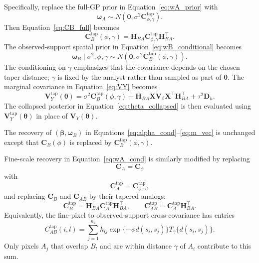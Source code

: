 \documentclass[11pt]{article}
\newcommand{\bsb}{\bm{\beta}}
\newcommand{\bsw}{\bm{\omega}}
\newcommand{\bstheta}{\bm{\theta}}
\begin{document}
Specifically, replace the full-GP prior in Equation~\eqref{eq:wA_prior} with
\begin{equation}
\bsw_A
\sim
N(\bm{0},\sigma^2\bm{C}^{\mathrm{tap}}_{\phi,\gamma}).
\label{eq:wA_taper_prior}
\end{equation}
Then Equation~\eqref{eq:CB_full} becomes
\begin{equation}
\bm{C}^{\mathrm{tap}}_B(\phi,\gamma)
=
\bm{H}_{BA}
\bm{C}^{\mathrm{tap}}_{\phi,\gamma}
\bm{H}_{BA}^{\top}.
\label{eq:CB_taper}
\end{equation}
The observed-support spatial prior in Equation~\eqref{eq:wB_conditional} becomes
\begin{equation}
\bsw_B\mid \sigma^2,\phi,\gamma
\sim
N\left(
\bm{0},
\sigma^2\bm{C}^{\mathrm{tap}}_B(\phi,\gamma)
\right).
\label{eq:wB_taper_cond}
\end{equation}
The conditioning on $\gamma$ emphasizes that the covariance depends on the chosen taper distance; $\gamma$ is fixed by the analyst rather than sampled as part of $\bstheta$.
The marginal covariance in Equation~\eqref{eq:VY} becomes
\begin{equation}
\bm{V}^{\mathrm{tap}}_Y(\bstheta)
=
\sigma^2\bm{C}^{\mathrm{tap}}_B(\phi,\gamma)
+
\bm{H}_{BA}\bm{X}\bm{V}_{\beta}\bm{X}^{\top}\bm{H}_{BA}^{\top}
+
\tau^2\bm{D}_h.
\label{eq:VY_taper}
\end{equation}
The collapsed posterior in Equation~\eqref{eq:theta_collapsed} is then evaluated using $\bm{V}^{\mathrm{tap}}_Y(\bstheta)$ in place of $\bm{V}_Y(\bstheta)$.

The recovery of $(\bsb,\bsw_B)$ in Equations~\eqref{eq:alpha_cond}--\eqref{eq:m_vec} is unchanged except that $\bm{C}_B(\phi)$ is replaced by $\bm{C}^{\mathrm{tap}}_B(\phi,\gamma)$.

Fine-scale recovery in Equation~\eqref{eq:wA_cond} is similarly modified by replacing
$$
\bm{C}_A=\bm{C}_{\phi}
$$
with
$$
\bm{C}^{\mathrm{tap}}_A=\bm{C}^{\mathrm{tap}}_{\phi,\gamma},
$$
and replacing $\bm{C}_B$ and $\bm{C}_{AB}$ by their tapered analogs:
\begin{equation}
\bm{C}^{\mathrm{tap}}_B
=
\bm{H}_{BA}\bm{C}^{\mathrm{tap}}_A\bm{H}_{BA}^{\top},
\qquad
\bm{C}^{\mathrm{tap}}_{AB}
=
\bm{C}^{\mathrm{tap}}_A\bm{H}_{BA}^{\top}.
\label{eq:taper_prediction_covs}
\end{equation}
Equivalently, the fine-pixel to observed-support cross-covariance has entries
\begin{equation}
C^{\mathrm{tap}}_{AB}(i,l)
=
\sum_{j=1}^{n_a}
h_{lj}
\exp\{-\phi d(s_i,s_j)\}
T_{\gamma}\{d(s_i,s_j)\}.
\label{eq:CAB_taper_double_sum}
\end{equation}
Only pixels $A_j$ that overlap $B_l$ and are within distance $\gamma$ of $A_i$ contribute to this sum.
\end{document}
